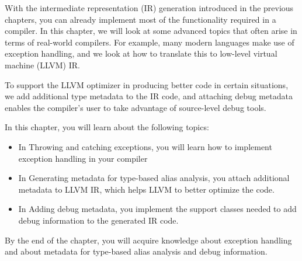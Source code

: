 With the intermediate representation (IR) generation introduced in the previous chapters, you can already implement most of the functionality required in a compiler. In this chapter, we will look at some advanced topics that often arise in terms of real-world compilers. For example, many modern languages make use of exception handling, and we look at how to translate this to low-level virtual machine (LLVM) IR.\par

To support the LLVM optimizer in producing better code in certain situations, we add  additional type metadata to the IR code, and attaching debug metadata enables the compiler's user to take advantage of source-level debug tools.\par

In this chapter, you will learn about the following topics:\par

\begin{itemize}
	\item In Throwing and catching exceptions, you will learn how to implement exception handling in your compiler
	\item In Generating metadata for type-based alias analysis, you attach additional metadata to LLVM IR, which helps LLVM to better optimize the code. 
	\item In Adding debug metadata, you implement the support classes needed to add debug 	information to the generated IR code.
\end{itemize}

By the end of the chapter, you will acquire knowledge about exception handling and about metadata for type-based alias analysis and debug information.\par







